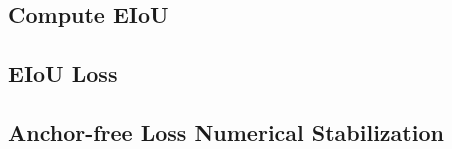 \chapter{}
\label{appendix:numerical-stabilization}

\section*{Compute EIoU}

\section*{EIoU Loss}

\section*{Anchor-free Loss Numerical Stabilization}
